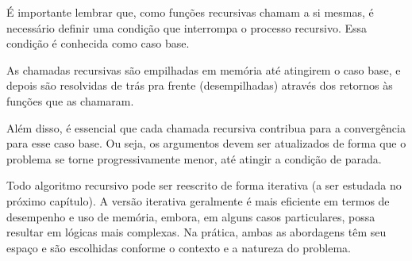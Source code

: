 É importante lembrar que, como funções recursivas chamam a si mesmas, é necessário definir uma condição que
interrompa o processo recursivo.
Essa condição é conhecida como caso base.

As chamadas recursivas são empilhadas em memória até atingirem o caso base, e depois são resolvidas de trás pra frente
(desempilhadas) através dos retornos às funções que as chamaram.

Além disso, é essencial que cada chamada recursiva contribua para a convergência para esse caso base.
Ou seja, os argumentos devem ser atualizados de forma que o problema se torne progressivamente menor,
até atingir a condição de parada.

Todo algoritmo recursivo pode ser reescrito de forma iterativa (a ser estudada no próximo capítulo).
A versão iterativa geralmente é mais eficiente em termos de desempenho e uso de memória, embora, em alguns casos
particulares, possa resultar em lógicas mais complexas.
Na prática, ambas as abordagens têm seu espaço e são escolhidas conforme o contexto e a natureza do problema.



